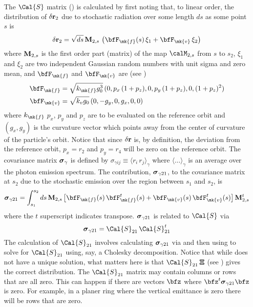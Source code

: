 The $\Cal{S}$ matrix () is calculated by first noting that, to linear order, the
distribution of $\delta{\bf r}_2$ due to stochastic radiation over some length $ds$ as some point $s$
is
\begin{equation}
  \delta\bfr_2 = \sqrt{ds} \, \bfM_{2,s} \, \left( \bfF_\mk{f}(s) \, \xi_1 + \bfF_\mk{v} \, \xi_2 \right)
\end{equation}
where ${\bf M}_{2,s}$ is the first order part (matrix) of the map $\calM_{2,s}$ from $s$ to $s_2$,
$\xi_1$ and $\xi_2$ are two independent Gaussian random numbers with unit sigma and zero mean, and
$\bfF_\mk{f}$ and $\bfF_\mk{v}$ are (see )
\begin{align}
  \bfF_\mk{f} &= \sqrt{k_\mk{f} g_0^3} \, (0, p_x \, (1 + p_z), 0, p_y \, (1 + p_z), 0, (1 + p_z)^2) \\
  \bfF_\mk{v} &= \sqrt{k_v g_0} \, (0, -g_y, 0, g_x, 0, 0)
  \label{fk000}
\end{align}
where $k_\mk{f}$ $p_x$, $p_y$ and $p_z$ are to be evaluated on the reference orbit and $(g_x, g_y)$ is the
curvature vector which points away from the center of curvature of the particle's orbit. Notice that since
$\delta{\bf r}$ is, by definition, the deviation from the reference orbit, $p_x = r_2$ and $p_y = r_4$
will be zero on the reference orbit. The covariance matrix ${\boldsymbol{\sigma}}_\gamma$ is defined by
$\sigma_{\gamma ij} \equiv \langle r_i \, r_j \rangle_\gamma$ where $\langle \ldots \rangle_\gamma$
is an average over the photon emission spectrum. The contribution, ${\boldsymbol{\sigma}}_{\gamma21}$, to the
covariance matrix at $s_2$ due to the stochastic emission over the region between $s_1$ and $s_2$,
is
\begin{equation}
  \bfsig_{\gamma21} = \int_{s_1}^{s_2} ds \, 
    \bfM_{2,s} \, \big[ 
    \bfF_\mk{f}(s) \, \bfF_\mk{f}^t(s) + \bfF_\mk{v}(s) \, \bfF_\mk{v}^t(s) \big] \, \bfM_{2,s}^t
  \label{smvvm}
\end{equation}
where the $t$ superscript indicates transpose. ${\boldsymbol{\sigma}}_{\gamma21}$ is related to $\Cal{S}$ via
\begin{equation}
  \bfsig_{\gamma21} = \Cal{S}_{21} \, \Cal{S}_{21}^t
  \label{sxx}
\end{equation}
The calculation of $\Cal{S}_{21}$ involves calculating ${\boldsymbol{\sigma}}_{\gamma21}$ via  and then
using  to solve for $\Cal{S}_{21}$ using, say, a Cholesky decomposition. Notice that while
 does not have a unique solution, what matters here is that $\Cal{S}_{21} \, \Bf\Xi$ (see
) gives the correct distribution. The $\Cal{S}_{21}$ matrix may contain columns or rows
that are all zero. This can happen if there are vectors $\bfz$ where $\bfz^t \bfsig_{\gamma21} \bfz$
is zero. For example, in a planer ring where the vertical emittance is zero there will be rows that
are zero.


